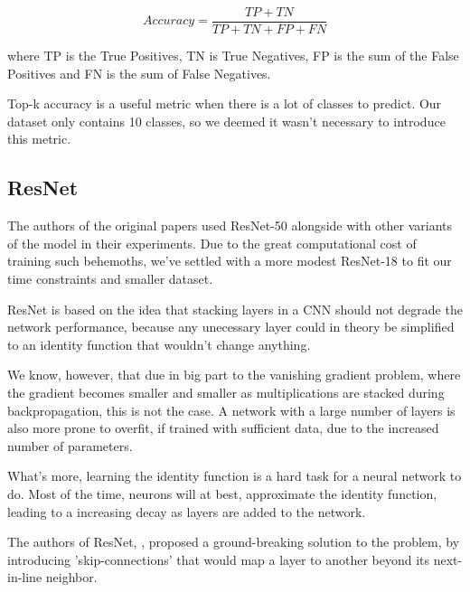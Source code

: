 \documentclass{article}
\begin{document}
$$ Accuracy = \frac{TP + TN}{TP + TN + FP + FN}  $$ \medskip \par

\noindent
where TP is the True Positives, TN is True Negatives, FP is the sum of the False Positives
and FN is the sum of False Negatives. \medskip \par

\noindent
Top-k accuracy is a useful metric when there is a lot of classes to predict. Our dataset only
contains 10 classes, so we deemed it wasn't necessary to introduce this metric.

\subsection{ResNet}

The authors of the original papers used ResNet-50 
alongside with other variants of the model in their experiments. 
Due to the great computational cost of training such behemoths, 
we've settled with a more modest ResNet-18 to fit our time constraints and smaller dataset. \medskip \par

\noindent
ResNet is based on the idea that stacking layers in a CNN should not degrade the network performance,
because any unecessary layer could in theory be simplified 
to an identity function that wouldn't change anything. \medskip \par

\noindent
We know, however, that due in big part to the vanishing gradient problem, 
where the gradient becomes smaller and smaller as multiplications are stacked during backpropagation, 
this is not the case. 
A network with a large number of layers is also more prone to overfit, 
if trained with sufficient data, due to the increased number of parameters. \medskip \par

\noindent
What's more, learning the identity function is a hard task for a neural network to do. 
Most of the time, neurons will at best, approximate the identity function, 
leading to a increasing decay as layers are added to the network. \medskip \par

\noindent
The authors of ResNet, \cite{resnet2015}, proposed a ground-breaking solution to the problem, 
by introducing 'skip-connections' 
that would map a layer to another beyond its next-in-line neighbor. \medskip \par
\end{document}
